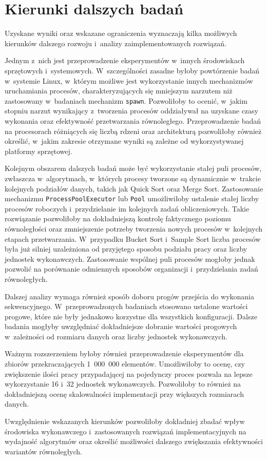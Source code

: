 \section{Kierunki dalszych badań}
\label{sec:DalszeBadania}

Uzyskane wyniki oraz wskazane ograniczenia wyznaczają kilka możliwych kierunków dalszego rozwoju i~analizy zaimplementowanych rozwiązań.

Jednym z~nich jest przeprowadzenie eksperymentów w~innych środowiskach sprzętowych i~systemowych. 
W~szczególności zasadne byłoby powtórzenie badań w~systemie Linux, w~którym możliwe jest wykorzystanie innych mechanizmów uruchamiania procesów, 
charakteryzujących się mniejszym narzutem niż zastosowany w~badaniach mechanizm \texttt{spawn}.
Pozwoliłoby to ocenić, w~jakim stopniu narzut wynikający z~tworzenia procesów 
oddziaływał na uzyskane czasy wykonania oraz efektywność przetwarzania równoległego.
Przeprowadzenie badań na procesorach różniących się liczbą rdzeni oraz architekturą pozwoliłoby również określić, 
w~jakim zakresie otrzymane wyniki są zależne od wykorzystywanej platformy sprzętowej.

Kolejnym obszarem dalszych badań może być wykorzystanie stałej puli procesów, zwłaszcza w~algorytmach, 
w~których procesy tworzone są dynamicznie w~trakcie kolejnych podziałów danych, takich jak Quick Sort oraz Merge Sort. 
Zastosowanie mechanizmu \texttt{ProcessPoolExecutor} lub \texttt{Pool} umożliwiłoby ustalenie stałej liczby procesów
roboczych i~przydzielanie im kolejnych zadań obliczeniowych.
Takie rozwiązanie pozwoliłoby na dokładniejszą kontrolę faktycznego poziomu równoległości 
oraz zmniejszenie potrzeby tworzenia nowych procesów w~kolejnych etapach przetwarzania.
W~przypadku Bucket Sort i~Sample Sort liczba procesów była już silniej uzależniona od 
przyjętego sposobu podziału pracy oraz liczby jednostek wykonawczych. 
Zastosowanie wspólnej puli procesów mogłoby jednak pozwolić na porównanie odmiennych sposobów organizacji i~przydzielania zadań równoległych.

Dalszej analizy wymaga również sposób doboru progów przejścia do wykonania sekwencyjnego. 
W~przeprowadzonych badaniach stosowano ustalone wartości progowe, które nie były jednakowo korzystne dla wszystkich konfiguracji. 
Dalsze badania mogłyby uwzględniać dokładniejsze dobranie wartości progowych w~zależności od rozmiaru danych oraz liczby jednostek wykonawczych.

Ważnym rozszerzeniem byłoby również przeprowadzenie eksperymentów dla zbiorów przekraczających 1~000~000 elementów. 
Umożliwiłoby to ocenę, czy zwiększenie ilości pracy przypadającej na pojedynczy proces 
pozwala na lepsze wykorzystanie 16 i~32 jednostek wykonawczych.
Pozwoliłoby to również na dokładniejszą ocenę skalowalności implementacji przy większych rozmiarach danych.

Uwzględnienie wskazanych kierunków pozwoliłoby dokładniej zbadać wpływ środowiska wykonawczego i~zastosowanych 
rozwiązań implementacyjnych na wydajność algorytmów oraz określić możliwości dalszego zwiększania efektywności wariantów równoległych.